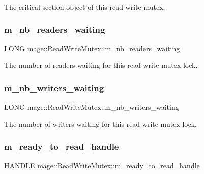 The critical section object of this read write mutex. \hypertarget{classmage_1_1_read_write_mutex_acbe7553fff7cca2656f6f2b8f0471484}{}\label{classmage_1_1_read_write_mutex_acbe7553fff7cca2656f6f2b8f0471484} 
\subsubsection{\texorpdfstring{m\+\_\+nb\+\_\+readers\+\_\+waiting}{m\_nb\_readers\_waiting}}
{\footnotesize\ttfamily L\+O\+NG mage\+::\+Read\+Write\+Mutex\+::m\+\_\+nb\+\_\+readers\+\_\+waiting\hspace{0.3cm}{\ttfamily [private]}}

The number of readers waiting for this read write mutex lock. \hypertarget{classmage_1_1_read_write_mutex_a003313794a9b43f80bd9b258b039438d}{}\label{classmage_1_1_read_write_mutex_a003313794a9b43f80bd9b258b039438d} 
\subsubsection{\texorpdfstring{m\+\_\+nb\+\_\+writers\+\_\+waiting}{m\_nb\_writers\_waiting}}
{\footnotesize\ttfamily L\+O\+NG mage\+::\+Read\+Write\+Mutex\+::m\+\_\+nb\+\_\+writers\+\_\+waiting\hspace{0.3cm}{\ttfamily [private]}}

The number of writers waiting for this read write mutex lock. \hypertarget{classmage_1_1_read_write_mutex_a65c0ef8b687d48104b09a9d175e72236}{}\label{classmage_1_1_read_write_mutex_a65c0ef8b687d48104b09a9d175e72236} 
\subsubsection{\texorpdfstring{m\+\_\+ready\+\_\+to\+\_\+read\+\_\+handle}{m\_ready\_to\_read\_handle}}
{\footnotesize\ttfamily H\+A\+N\+D\+LE mage\+::\+Read\+Write\+Mutex\+::m\+\_\+ready\+\_\+to\+\_\+read\+\_\+handle\hspace{0.3cm}{\ttfamily [private]}}

